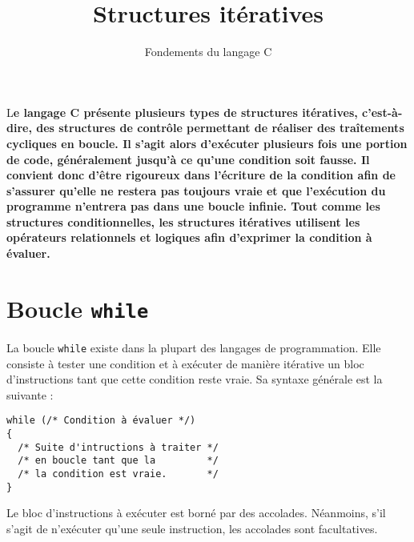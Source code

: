 \documentclass[DIV=calc,paper=a4,fontsize=11pt,twocolumn,halfparskip,parindent]{scrartcl} %
\title{Structures itératives} %
\author{Fondements du langage C} %
\date{} %
\newcommand{\initial}[1]{ %
\lettrine[lines=3,lhang=0.3,nindent=0em]{
\color{DarkGoldenrod}
      {\textsf{#1}}}{}}
\begin{document}
\maketitle %
\thispagestyle{fancy} %

\initial{L}\textbf{e langage C présente plusieurs types de structures itératives, c'est-à-dire, des structures de contrôle permettant de réaliser des traîtements
  cycliques en boucle. Il s'agit alors d'exécuter plusieurs fois une portion de code, généralement jusqu'à ce qu'une condition soit fausse. Il convient donc d'être
  rigoureux dans l'écriture de la condition afin de s'assurer qu'elle ne restera pas toujours vraie et que l'exécution du programme n'entrera pas dans une boucle
  infinie. Tout comme les structures conditionnelles, les structures itératives utilisent les opérateurs relationnels et logiques afin d'exprimer la condition à évaluer.}

\section*{Boucle \texttt{while}}
La boucle \texttt{while} existe dans la plupart des langages de programmation. Elle consiste à tester une condition et à exécuter de manière itérative un bloc
d'instructions tant que cette condition reste vraie. Sa syntaxe générale est la suivante :
\begin{lstlisting}[frame=single]
while (/* Condition à évaluer */)
{
  /* Suite d'intructions à traiter */
  /* en boucle tant que la         */
  /* la condition est vraie.       */
}
\end{lstlisting}

Le bloc d'instructions à exécuter est borné par des accolades. Néanmoins, s'il s'agit de n'exécuter qu'une seule instruction, les accolades sont facultatives.
\end{document}
